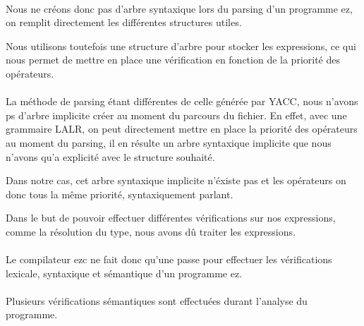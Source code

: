 \paragraph{}Nous ne créons donc pas d'arbre syntaxique lors du parsing d'un 
programme ez, on remplit directement les différentes structures utiles. 

Nous utilisons toutefois une structure d'arbre pour stocker les expressions, 
ce qui nous permet de mettre en place une vérification en fonction de la 
priorité des opérateurs.

\paragraph{} La méthode de parsing étant différentes de celle générée par YACC, 
nous n'avons ps d'arbre implicite créer au moment du parcours du fichier. En 
effet, avec une grammaire LALR, on peut directement mettre en place la priorité 
des opérateurs au moment du parsing, il en résulte un arbre syntaxique 
implicite que nous n'avons qu'a explicité avec le structure souhaité.

Dans notre cas, cet arbre syntaxique implicite n'éxiste pas et les opérateurs 
on donc tous la même priorité, syntaxiquement parlant.

Dans le but de pouvoir effectuer différentes vérifications sur nos expressions, 
comme la résolution du type, nous avons dû traiter les expressions.


\paragraph{}Le compilateur ezc ne fait donc qu'une passe pour effectuer les 
vérifications lexicale, syntaxique et sémantique d'un programme ez.

\paragraph{}Plusieurs vérifications sémantiques sont effectuées durant 
l'analyse du programme.

